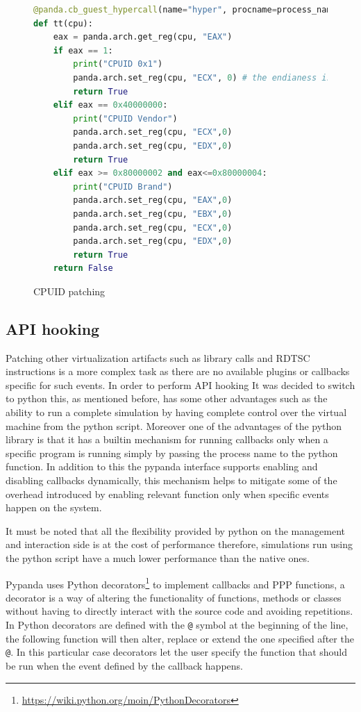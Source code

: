 \begin{figure}[htp]
\centering
\begin{lstlisting}[language=Python] 
@panda.cb_guest_hypercall(name="hyper", procname=process_name)
def tt(cpu):
    eax = panda.arch.get_reg(cpu, "EAX")
    if eax == 1:
        print("CPUID 0x1")
        panda.arch.set_reg(cpu, "ECX", 0) # the endianess is swapped (?)
        return True
    elif eax == 0x40000000:
        print("CPUID Vendor")
        panda.arch.set_reg(cpu, "ECX",0)
        panda.arch.set_reg(cpu, "EDX",0)
        return True
    elif eax >= 0x80000002 and eax<=0x80000004:
        print("CPUID Brand")
        panda.arch.set_reg(cpu, "EAX",0)
        panda.arch.set_reg(cpu, "EBX",0)
        panda.arch.set_reg(cpu, "ECX",0)
        panda.arch.set_reg(cpu, "EDX",0)
        return True
    return False
\end{lstlisting}
\caption{CPUID patching}
\label{fig:cpuidpat}
\end{figure}


\subsection{API hooking}

Patching other virtualization artifacts such as library calls and RDTSC instructions is a more complex task as there are no available plugins or callbacks specific for such events. In order to perform API hooking It was decided to switch to python this, as mentioned before, has some other advantages such as the ability to run a complete simulation by having complete control over the virtual machine from the python script. Moreover one of the advantages of the python library is that it has a builtin mechanism for running callbacks only when a specific program is running simply by passing the process name to the python function. In addition to this the pypanda interface supports enabling and disabling callbacks dynamically, this mechanism helps to mitigate some of the overhead introduced by enabling relevant function only when specific events happen on the system.

It must be noted that all the flexibility provided by python on the management and interaction side is at the cost of performance therefore, simulations run using the python script have a much lower performance than the native ones. 

Pypanda uses Python decorators\footnote{\url{https://wiki.python.org/moin/PythonDecorators}} to implement callbacks and PPP functions, a decorator is a way of altering the functionality of functions, methods or classes without having to directly interact with the source code and avoiding repetitions. In Python decorators are defined with the \lstinline{@} symbol at the beginning of the line, the following function will then alter, replace or extend the one specified after the \lstinline{@}. In this particular case decorators let the user specify the function that should be run when the event defined by the callback happens. 

